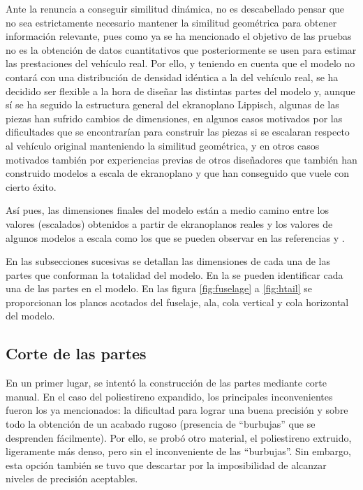 Ante la renuncia a conseguir similitud dinámica, no es descabellado pensar que no sea estrictamente necesario mantener la similitud geométrica para obtener información relevante, pues como ya se ha mencionado el objetivo de las pruebas no es la obtención de datos cuantitativos que posteriormente se usen para estimar las prestaciones del vehículo real. Por ello, y teniendo en cuenta que el modelo no contará con una distribución de densidad idéntica a la del vehículo real, se ha decidido ser flexible a la hora de diseñar las distintas partes del modelo y, aunque sí se ha seguido la estructura general del ekranoplano Lippisch, algunas de las piezas han sufrido cambios de dimensiones, en algunos casos motivados por las dificultades que se encontrarían para construir las piezas si se escalaran respecto al vehículo original manteniendo la similitud geométrica, y en otros casos motivados también por experiencias previas de otros diseñadores que también han construido modelos a escala de ekranoplano y que han conseguido que vuele con cierto éxito.

Así pues, las dimensiones finales del modelo están a medio camino entre los valores (escalados) obtenidos a partir de ekranoplanos reales y los valores de algunos modelos a escala como los que se pueden observar en las referencias \cite{ref:youtubegev} y \cite{ref:youtubedelta2}.

En las subsecciones sucesivas se detallan las dimensiones de cada una de las partes que conforman la totalidad del modelo. En la  se pueden identificar cada una de las partes en el modelo. En las figura \ref{fig:fuselage} a \ref{fig:htail} se proporcionan los planos acotados del fuselaje, ala, cola vertical y cola horizontal del modelo.

\subsection{Corte de las partes}
\label{sec:building:technique}

En un primer lugar, se intentó la construcción de las partes mediante corte manual. En el caso del poliestireno expandido, los principales inconvenientes fueron los ya mencionados: la dificultad para lograr una buena precisión y sobre todo la obtención de un acabado rugoso (presencia de “burbujas” que se desprenden fácilmente). Por ello, se probó otro material, el poliestireno extruido, ligeramente más denso\cite{ref:poliestirenoextruido}, pero sin el inconveniente de las “burbujas”. Sin embargo, esta opción también se tuvo que descartar por la imposibilidad de alcanzar niveles de precisión aceptables.

